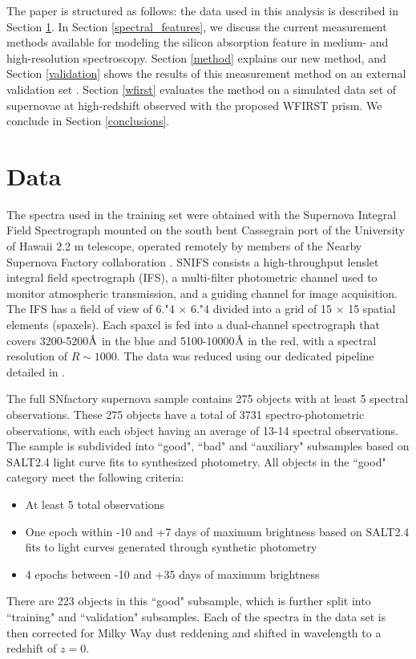 The paper is structured as follows: the data used in this analysis is described in Section \ref{data}. In Section \ref{spectral_features}, we discuss the current measurement methods available for modeling the silicon absorption feature in medium- and high-resolution spectroscopy. Section \ref{method} explains our new method, and Section \ref{validation} shows the results of this measurement method on an external validation set \citep[BSNIP,][]{silverman_berkeley_2012}. Section \ref{wfirst} evaluates the method on a simulated data set of supernovae at high-redshift observed with the proposed WFIRST prism. We conclude in Section \ref{conclusions}.

\section{Data}
\label{data}
The spectra used in the training set were obtained with the Supernova Integral Field Spectrograph \citep[SNIFS,][]{lantz_snifs_2004} mounted on  the south bent Cassegrain port of the University of Hawaii 2.2 m telescope, operated remotely by members of the Nearby Supernova Factory collaboration \citep[SNfactory,][]{aldering_overview_2002}. SNIFS consists a high-throughput lenslet integral field spectrograph (IFS), a multi-filter photometric channel used to monitor atmospheric transmission, and a guiding channel for image acquisition. The IFS has a field of view of 6."4 $\times$ 6."4 divided into a grid of 15 $\times$ 15 spatial elements (spaxels). Each spaxel is fed into a dual-channel spectrograph that covers 3200-5200$\mbox{\normalfont\AA}$ in the blue and 5100-10000$\mbox{\normalfont\AA}$ in the red, with a spectral resolution of $R \sim 1000$. The data was reduced using our dedicated pipeline detailed in \parencite{ponder_2020}.

The full SNfactory supernova sample contains 275 objects with at least 5 spectral observations. These 275 objects have a total of 3731 spectro-photometric observations, with each object having an average of 13-14 spectral observations. The sample is subdivided into ``good", ``bad" and ``auxiliary" subsamples based on SALT2.4 light curve fits to synthesized photometry. All objects in the ``good" category meet the following criteria:
\begin{itemize}
    \item At least 5 total observations
    \item One epoch within -10 and +7 days of maximum brightness based on SALT2.4 fits to light curves generated through synthetic photometry
    \item 4 epochs between -10 and +35 days of maximum brightness 
\end{itemize}
There are 223 objects in this ``good" subsample, which is further split into ``training" and ``validation" subsamples. Each of the spectra in the data set is then corrected for Milky Way dust reddening and shifted in wavelength to a redshift of $z=0$.

